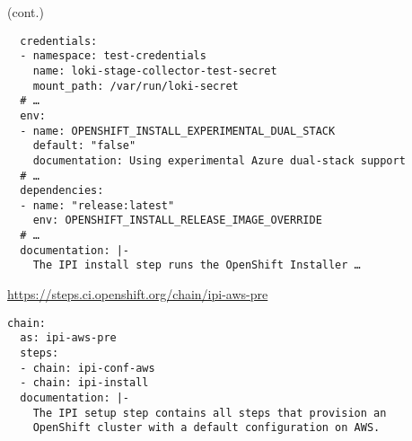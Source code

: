 \begin{frame}[fragile]
    \autotitle
    \footnotesize
    (cont.)
    \begin{verbatim}
  credentials:
  - namespace: test-credentials
    name: loki-stage-collector-test-secret
    mount_path: /var/run/loki-secret
  # …
  env:
  - name: OPENSHIFT_INSTALL_EXPERIMENTAL_DUAL_STACK
    default: "false"
    documentation: Using experimental Azure dual-stack support
  # …
  dependencies:
  - name: "release:latest"
    env: OPENSHIFT_INSTALL_RELEASE_IMAGE_OVERRIDE
  # …
  documentation: |-
    The IPI install step runs the OpenShift Installer …
    \end{verbatim}
\end{frame}

\begin{frame}[fragile]
    \autotitle
    \footnotesize
    \url{https://steps.ci.openshift.org/chain/ipi-aws-pre}
    \vspace{\baselineskip}
    \begin{verbatim}
chain:
  as: ipi-aws-pre
  steps:
  - chain: ipi-conf-aws
  - chain: ipi-install
  documentation: |-
    The IPI setup step contains all steps that provision an
    OpenShift cluster with a default configuration on AWS.
    \end{verbatim}
\end{frame}

